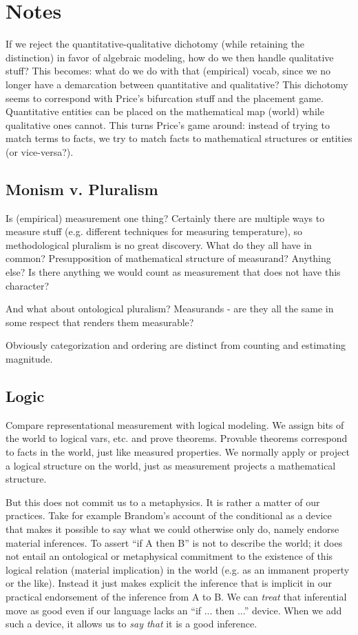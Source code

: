 \documentclass[11pt,twoside]{article}
\begin{document}
\noindent
\cite{smith_refining_2011}

\section{Notes}

If we reject the quantitative-qualitative dichotomy (while retaining
the distinction) in favor of algebraic modeling, how do we then handle
qualitative stuff?  This becomes: what do we do with that (empirical)
vocab, since we no longer have a demarcation between quantitative and
qualitative?  This dichotomy seems to correspond with Price's
bifurcation stuff and the placement game.  Quantitative entities can
be placed on the mathematical map (world) while qualitative ones
cannot.  This turns Price's game around: instead of trying to match
terms to facts, we try to match facts to mathematical structures or
entities (or vice-versa?).

\subsection{Monism v. Pluralism}

Is (empirical) measurement one thing?  Certainly there are multiple
ways to measure stuff (e.g. different techniques for measuring
temperature), so methodological pluralism is no great discovery.  What
do they all have in common?  Presupposition of mathematical structure
of measurand?  Anything else?  Is there anything we would count as
measurement that does not have this character?

And what about ontological pluralism?  Measurands - are they all the
same in some respect that renders them measurable?

Obviously categorization and ordering are distinct from counting and
estimating magnitude.

\subsection{Logic}

Compare representational measurement with logical modeling.  We assign
bits of the world to logical vars, etc. and prove theorems.  Provable
theorems correspond to facts in the world, just like measured
properties.  We normally apply or project a logical structure on the
world, just as measurement projects a mathematical structure.

But this does not commit us to a metaphysics.  It is rather a matter
of our practices.  Take for example Brandom's account of the
conditional as a device that makes it possible to say what we could
otherwise only do, namely endorse material inferences.  To assert ``if
A then B'' is not to describe the world; it does not entail an
ontological or metaphysical commitment to the existence of this
logical relation (material implication) in the world (e.g. as an
immanent property or the like).  Instead it just makes explicit the
inference that is implicit in our practical endorsement of the
inference from A to B.  We can \textit{treat} that inferential move as
good even if our language lacks an ``if ... then ...'' device.  When
we add such a device, it allows us to \textit{say that} it is a good
inference.
\end{document}
